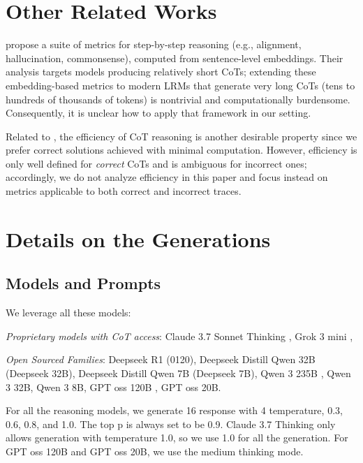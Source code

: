 \section{Other Related Works}


\citet{golovnevaroscoe} propose a suite of metrics for step-by-step reasoning (e.g., alignment, hallucination, commonsense), computed from sentence-level embeddings. Their analysis targets models producing relatively short CoTs; extending these embedding-based metrics to modern LRMs that generate very long CoTs (tens to hundreds of thousands of tokens) is nontrivial and computationally burdensome. Consequently, it is unclear how to apply that framework in our setting.

Related to \length, the efficiency of CoT reasoning \citep{zhang2025reasoning, an2025don, gao2025far} is another desirable property since we prefer correct solutions achieved with minimal computation. However, efficiency is only well defined for \emph{correct} CoTs and is ambiguous for incorrect ones; accordingly, we do not analyze efficiency in this paper and focus instead on metrics applicable to both correct and incorrect traces.




\section{Details on the Generations}

\subsection{Models and Prompts}

We leverage all these models:

\textit{Proprietary models with CoT access}:  Claude 3.7 Sonnet Thinking \citep{anthropic2025claude37}, Grok 3 mini \citep{xai2025grok3mini},

\textit{Open Sourced Families}: Deepseek R1 (0120), Deepseek Distill Qwen 32B (Deepseek 32B), Deepseek Distill Qwen 7B (Deepseek 7B), Qwen 3 235B \citep{yang2025qwen3}, Qwen 3 32B, Qwen 3 8B, GPT oss 120B \citep{agarwal2025gptoss}, GPT oss 20B.


For all the reasoning models, we generate 16 response with 4 temperature, 0.3, 0.6, 0.8, and 1.0. The top p is always set to be 0.9. Claude 3.7 Thinking only allows generation with temperature 1.0, so we use 1.0 for all the generation. For GPT oss 120B and GPT oss 20B, we use the medium thinking mode.

